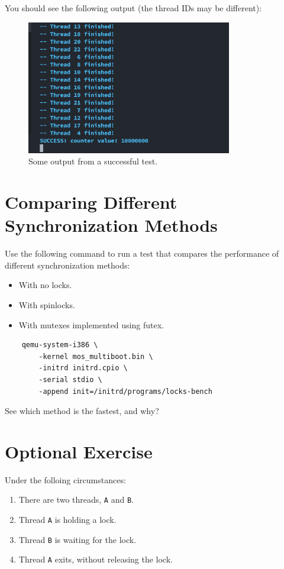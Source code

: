 You should see the following output (the thread IDs may be different):

\begin{figure}[h]
    \centering
    \includegraphics[width=0.8\textwidth]{assets/c3.futex-output.png}
    \caption{Some output from a successful test.}
\end{figure}

\section{Comparing Different Synchronization Methods}

Use the following command to run a test that compares the performance of different
synchronization methods:

\begin{itemize}
    \item With no locks.
    \item With spinlocks.
    \item With mutexes implemented using futex.
\end{itemize}

\begin{verbatim}
    qemu-system-i386 \
        -kernel mos_multiboot.bin \
        -initrd initrd.cpio \
        -serial stdio \
        -append init=/initrd/programs/locks-bench
\end{verbatim}

See which method is the fastest, and why?

\section{Optional Exercise}

Under the folloing circumstances:

\begin{enumerate}
    \item There are two threads, \texttt{A} and \texttt{B}.
    \item Thread \texttt{A} is holding a lock.
    \item Thread \texttt{B} is waiting for the lock.
    \item Thread \texttt{A} exits, without releasing the lock.
\end{enumerate}

